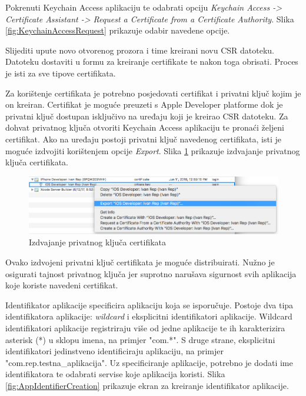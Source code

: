 \documentclass[times, utf8, diplomski, numeric]{fer}
\begin{document}
\begin{appendices}
Pokrenuti Keychain Access aplikaciju te odabrati opciju \textit{Keychain Access -> Certificate Assistant -> Request a Certificate from a Certificate Authority}. Slika \ref{fig:KeychainAccessRequest} prikazuje odabir navedene opcije.

Slijediti upute novo otvorenog prozora i time kreirani novu CSR datoteku. Datoteku dostaviti u formu za kreiranje certifikate te nakon toga obrisati. Proces je isti za sve tipove certifikata.

Za korištenje certifikata je potrebno posjedovati certifikat i privatni ključ kojim je on kreiran. Certifikat je moguće preuzeti s Apple Developer platforme dok je privatni ključ dostupan isključivo na uređaju koji je kreirao CSR datoteku. Za dohvat privatnog ključa otvoriti Keychain Access aplikaciju te pronaći željeni certifikat. Ako na uređaju postoji privatni ključ navedenog certifikata, isti je moguće izdvojiti korištenjem opcije \textit{Export}. Slika \ref{fig:PrivateKeyExport} prikazuje izdvajanje privatnog ključa certifikata.

\begin{figure}[b!]
\centering
\includegraphics[scale=0.4]{PrivateKeyExport}
\caption{Izdvajanje privatnog ključa certifikata}
\label{fig:PrivateKeyExport}
\end{figure}

Ovako izdvojeni privatni ključ certifikata je moguće distribuirati. Nužno je osigurati tajnost privatnog ključa jer suprotno narušava sigurnost svih aplikacija koje koriste navedeni certifikat.

Identifikator aplikacije specificira aplikaciju koja se isporučuje. Postoje dva tipa identifikatora aplikacije: \textit{wildcard} i eksplicitni identifikatori aplikacije. Wildcard identifikatori aplikacije registriraju više od jedne aplikacije te ih karakterizira asterisk (*) u sklopu imena, na primjer "com.*". S druge strane, eksplicitni identifikatori jedinstveno identificiraju aplikaciju, na primjer "com.rep.testna\_aplikacija". Uz specificiranje aplikacije, potrebno je dodati ime identifikatora te odabrati servise koje aplikacija koristi. Slika \ref{fig:AppIdentifierCreation} prikazuje ekran za kreiranje identifikator aplikacije.


\end{appendices}
\end{document}
